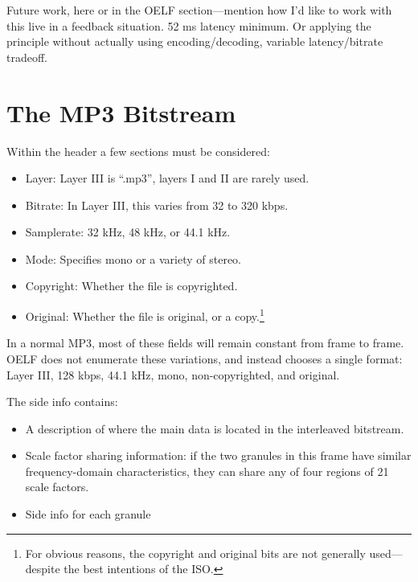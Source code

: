 \documentclass{thesis}
\begin{document}
	Future work, here or in the OELF section---mention how I'd like to work with this live in a feedback situation. 52 ms latency minimum. Or applying the principle without actually using encoding/decoding, variable latency/bitrate tradeoff.

\begin{singlespace}


\end{singlespace}

\appendix 
{}

\chapter{The MP3 Bitstream}
	
	Within the header a few sections must be considered:
	
\begin{itemize}
	\item Layer: Layer III is ``.mp3'', layers I and II are rarely used.
	\item Bitrate: In Layer III, this varies from 32 to 320 kbps.
	\item Samplerate: 32 kHz, 48 kHz, or 44.1 kHz.
	\item Mode: Specifies mono or a variety of stereo.
	\item Copyright: Whether the file is copyrighted.
	\item Original: Whether the file is original, or a copy.\footnote{For obvious reasons, the copyright and original bits are not generally used---despite the best intentions of the ISO.}	
\end{itemize}

	In a normal MP3, most of these fields will remain constant from frame to frame. OELF does not enumerate these variations, and instead chooses a single format: Layer III, 128 kbps, 44.1 kHz, mono, non-copyrighted, and original.
	
	The side info contains:
	
\begin{itemize}
	\item A description of where the main data is located in the interleaved bitstream.
	\item Scale factor sharing information: if the two granules in this frame have similar frequency-domain characteristics, they can share any of four regions of 21 scale factors.
	\item Side info for each granule
\end{itemize}
\end{document}
